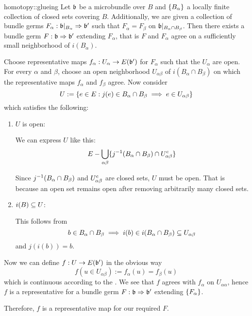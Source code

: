 \begin{mylemma}{homotopy::glueing}
    Let $\mathfrak{b}$ be a microbundle over $B$ and $\{B_\alpha\}$ a locally finite collection of closed sets covering $B$.
    Additionally, we are given a collection of bundle germs $F_\alpha: \mathfrak{b}\vert_{B_\alpha} \Rightarrow{} \mathfrak{b}'$
    such that $F_\alpha = F_\beta$ on $\mathfrak{b}\vert_{B_\alpha \cap B_\beta}$.
    Then there exists a bundle germ $F: \mathfrak{b} \Rightarrow{} \mathfrak{b}'$ extending $F_\alpha$,
    that is $F$ and $F_\alpha$ agree on a sufficiently small neighborhood of $i(B_\alpha)$.
\end{mylemma}

\begin{myproof}
    Choose representative maps $f_\alpha: U_\alpha \to E(\mathfrak{b}')$ for $F_\alpha$ such that the $U_\alpha$ are open.
    For every $\alpha$ and $\beta$, choose an open neighborhood $U_{\alpha\beta}$ of $i(B_\alpha \cap B_\beta)$ on which the representative maps $f_\alpha$ and $f_\beta$ agree.
    Now consider
    \[ U := \{ e \in E:j(e) \in B_\alpha \cap B_\beta \implies e \in U_{\alpha\beta}\} \]
    which satisfies the following:
    \begin{enumerate}
        \item $U$ is open:

        We can express $U$ like this:
        \[ E - \bigcup_{\alpha\beta} \{ j^{-1}(B_\alpha \cap B_\beta) \cap U_{\alpha\beta}^c \} \]
        
        Since $j^{-1}(B_\alpha \cap B_\beta)$ and $U_{\alpha\beta}^c$ are closed sets, $U$ must be open.
        That is because an open set remains open after removing arbitrarily many closed sets.
        \item $i(B) \subseteq{} U$:
        
        This follows from
        \[ b \in B_\alpha \cap B_\beta \implies i(b) \in i(B_\alpha \cap B_\beta) \subseteq{} U_{\alpha\beta} \]
        and $j(i(b)) = b$.
    \end{enumerate}
    Now we can define $f: U \to E(\mathfrak{b}')$ in the obvious way
    \[ f(u \in U_{\alpha\beta}) := f_\alpha(u) = f_\beta(u) \]
    which is continuous according to the .
    We see that $f$ agrees with $f_\alpha$ on $U_{\alpha\alpha}$,
    hence $f$ is a representative for a bundle germ $F: \mathfrak{b} \Rightarrow{} \mathfrak{b}'$ extending $\{F_\alpha\}$.
    
    Therefore, $f$ is a representative map for our required $F$.
\end{myproof}
